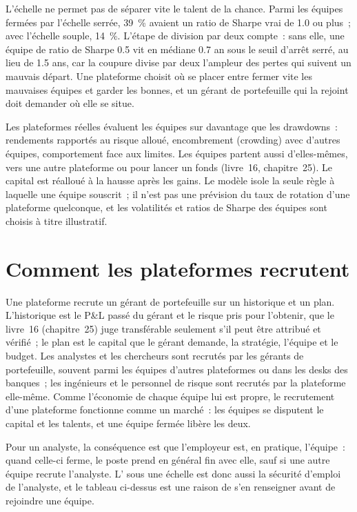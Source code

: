 L'échelle ne permet pas de séparer vite le talent de la chance. Parmi les équipes fermées par l'échelle serrée, 39~\% avaient un ratio de Sharpe vrai
de 1.0 ou plus~; avec l'échelle souple, 14~\%. L'étape de division par deux compte~: sans elle, une équipe de ratio de Sharpe 0.5 vit en médiane 0.7 an sous le seuil d'arrêt serré,
au lieu de 1.5 ans, car la coupure divise par deux l'ampleur des pertes qui suivent un mauvais départ.
Une plateforme choisit où se placer entre fermer vite les mauvaises équipes et garder les bonnes, et un gérant de portefeuille
qui la rejoint doit demander où elle se situe.

\begin{remark}\label{rem:in:multi-manager-platforms:model}
Les plateformes réelles évaluent les équipes sur davantage que les drawdowns~: rendements rapportés au risque alloué, encombrement (crowding) avec d'autres équipes,
comportement face aux limites. Les équipes partent aussi d'elles-mêmes, vers une autre plateforme ou pour lancer un fonds (livre~16, chapitre~25).
Le capital est réalloué à la hausse après les gains. Le modèle isole la seule règle à laquelle une équipe souscrit~; il n'est pas une prévision
du taux de rotation d'une plateforme quelconque, et les volatilités et ratios de Sharpe des équipes sont choisis à titre illustratif.
\end{remark}

\section{Comment les plateformes recrutent}

Une plateforme recrute un gérant de portefeuille sur un historique et un plan. L'historique est le P\&L passé du gérant et le risque pris pour l'obtenir,
que le livre~16 (chapitre~25) juge transférable seulement s'il peut être attribué et vérifié~; le plan est le capital
que le gérant demande, la stratégie, l'équipe et le budget. Les analystes et les chercheurs sont recrutés par les gérants
de portefeuille, souvent parmi les équipes d'autres plateformes ou dans les desks des banques~; les ingénieurs et le personnel de risque sont recrutés par la plateforme elle-même.
Comme l'économie de chaque équipe lui est propre, le recrutement d'une plateforme fonctionne comme un marché~: les équipes se disputent le capital et les talents,
et une équipe fermée libère les deux.

Pour un analyste, la conséquence est que l'employeur est, en pratique, l'équipe~: quand celle-ci ferme, le poste
prend en général fin avec elle, sauf si une autre équipe recrute l'analyste. L' sous une échelle est donc aussi la sécurité d'emploi de l'analyste,
et le tableau ci-dessus est une raison de s'en renseigner avant de rejoindre une équipe.

